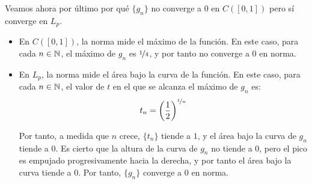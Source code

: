 \begin{ejercicio}
Veamos ahora por último por qué $\{g_n\}$ no converge a $0$ en $C([0, 1])$ pero sí converge en $L_p$.
\begin{itemize}
    \item En $C([0, 1])$, la norma mide el máximo de la función. En este caso, para cada $n\in \mathbb{N}$, el máximo de $g_n$ es $\nicefrac{1}{4}$, y por tanto no converge a $0$ en norma.
    \item En $L_p$, la norma mide el área bajo la curva de la función. En este caso, para cada $n\in \mathbb{N}$, el valor de $t$ en el que se alcanza el máximo de $g_n$ es:
    \begin{equation*}
        t_n = \left(\frac{1}{2}\right)^{\nicefrac{1}{n}}
    \end{equation*}

    Por tanto, a medida que $n$ crece, $\{t_n\}$ tiende a $1$, y el área bajo la curva de $g_n$ tiende a $0$. Es cierto que la altura de la curva de $g_n$ no tiende a $0$, pero el pico es empujado progresivamente hacia la derecha, y por tanto el área bajo la curva tiende a $0$. Por tanto, $\{g_n\}$ converge a $0$ en norma.
\end{itemize}


\end{ejercicio}
